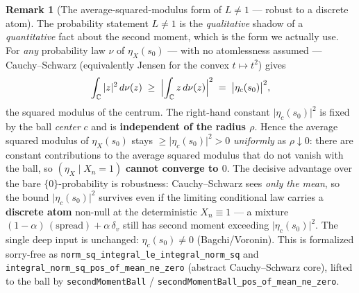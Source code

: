\documentclass[11pt,a4paper]{article}
\theoremstyle{definition}
\newtheorem{remark}[theorem]{Remark}
\newcommand{\etaX}{\eta_X}
\begin{document}
\begin{remark}[The average-squared-modulus form of \(L\neq1\) --- robust to a discrete atom]\label{rem:secondmoment}
The probability statement \(L\neq1\) is the \emph{qualitative} shadow of a \emph{quantitative}
fact about the second moment, which is the form we actually use. For \emph{any} probability
law \(\nu\) of \(\etaX(s_0)\) --- with no atomlessness assumed --- Cauchy--Schwarz (equivalently
Jensen for the convex \(t\mapsto t^2\)) gives
\[
  \int_{\mathbb{C}}|z|^2\,d\nu(z)\;\ge\;\Bigl|\int_{\mathbb{C}}z\,d\nu(z)\Bigr|^2
  \;=\;\bigl|\eta_c(s_0)\bigr|^2 ,
\]
the squared modulus of the centrum. The right-hand constant \(\bigl|\eta_c(s_0)\bigr|^2\) is
fixed by the ball \emph{center} \(c\) and is \textbf{independent of the radius \(\rho\)}. Hence
the average squared modulus of \(\etaX(s_0)\) stays \(\ge\bigl|\eta_c(s_0)\bigr|^2>0\)
\emph{uniformly} as \(\rho\downarrow0\): there are constant contributions to the average squared
modulus that do not vanish with the ball, so \((\etaX\mid X_n=1)\) \textbf{cannot converge to
\(0\)}. The decisive advantage over the bare \(\{0\}\)-probability is robustness: Cauchy--Schwarz
sees \emph{only the mean}, so the bound \(\bigl|\eta_c(s_0)\bigr|^2\) survives even if the limiting
conditional law carries a \textbf{discrete atom} non-null at the deterministic \(X_n\equiv1\) ---
a mixture \((1-\alpha)\,(\text{spread})+\alpha\,\delta_v\) still has second moment exceeding
\(\bigl|\eta_c(s_0)\bigr|^2\). The single deep input is unchanged: \(\eta_c(s_0)\neq0\)
(Bagchi/Voronin). This is formalized sorry-free as
\texttt{norm\_sq\_integral\_le\_integral\_norm\_sq} and
\texttt{integral\_norm\_sq\_pos\_of\_mean\_ne\_zero} (abstract Cauchy--Schwarz core), lifted to the
ball by \texttt{secondMomentBall} / \texttt{secondMomentBall\_pos\_of\_mean\_ne\_zero}.
\end{remark}
\end{document}
